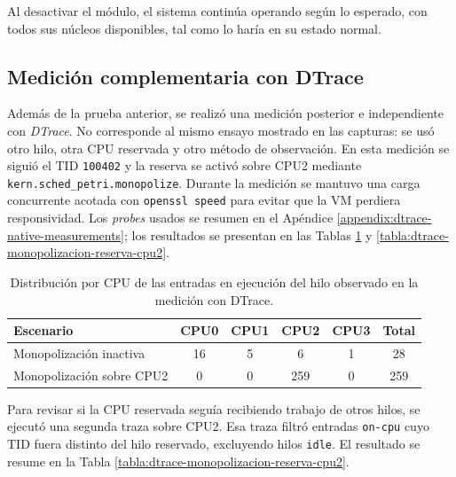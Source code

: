 Al desactivar el módulo, el sistema continúa operando según lo esperado, con todos sus núcleos disponibles, tal como lo haría en su estado normal.\par

\subsection{Medición complementaria con DTrace}

Además de la prueba anterior, se realizó una medición posterior e independiente con \textit{DTrace}. No corresponde al mismo ensayo mostrado en las capturas: se usó otro hilo, otra CPU reservada y otro método de observación. En esta medición se siguió el TID \verb|100402| y la reserva se activó sobre CPU2 mediante \verb|kern.sched_petri.monopolize|. Durante la medición se mantuvo una carga concurrente acotada con \verb|openssl speed| para evitar que la VM perdiera responsividad. Los \textit{probes} usados se resumen en el Apéndice \ref{appendix:dtrace-native-measurements}; los resultados se presentan en las Tablas \ref{tabla:dtrace-monopolizacion-cpu2} y \ref{tabla:dtrace-monopolizacion-reserva-cpu2}.\par

\begin{table}[H]
    \centering
    \small
    \setlength{\tabcolsep}{5pt}
    \begin{tabular}{|>{\RaggedRight\arraybackslash}p{}|c|c|c|c|c|}
        \hline
        \textbf{Escenario} & \textbf{CPU0} & \textbf{CPU1} & \textbf{CPU2} & \textbf{CPU3} & \textbf{Total} \\
        \hline
        Monopolización inactiva & 16 & 5 & 6 & 1 & 28 \\
        \hline
        Monopolización sobre CPU2 & 0 & 0 & 259 & 0 & 259 \\
        \hline
    \end{tabular}
    \caption{Distribución por CPU de las entradas en ejecución del hilo observado en la medición con DTrace.}
    \label{tabla:dtrace-monopolizacion-cpu2}
\end{table}

Para revisar si la CPU reservada seguía recibiendo trabajo de otros hilos, se ejecutó una segunda traza sobre CPU2. Esa traza filtró entradas \verb|on-cpu| cuyo TID fuera distinto del hilo reservado, excluyendo hilos \verb|idle|. El resultado se resume en la Tabla \ref{tabla:dtrace-monopolizacion-reserva-cpu2}.\par

